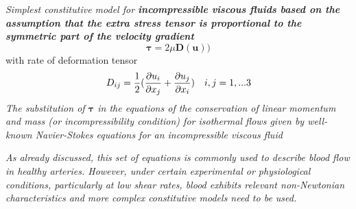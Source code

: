 \documentclass[11pt,letterpaper]{article}
\begin{document}
\textit{{\color{red}Simplest constitutive
model for \textbf{incompressible viscous fluids based on the assumption that the extra stress tensor is proportional to the symmetric part of the velocity gradient}}}\begin{equation}
    \bm{\tau}= 2\mu \bm{D}(\bm{u}))
\end{equation}
with rate of deformation tensor \begin{equation}
    D_{ij} = \frac{1}{2} \large( \frac{\partial u_i}{\partial x_j} + \frac{\partial u_j}{\partial x_i} \large) \hspace{10pt} i,j=1,...3
\end{equation}
\textit{The substitution of $\bm{\tau}$ in the equations of the conservation of linear momentum and mass (or incompressibility condition) for isothermal flows given by well-known Navier-Stokes equations for an incompressible viscous fluid}

\textit{As already discussed, this set of equations is commonly used to describe blood flow in healthy arteries.
However, under certain experimental or physiological conditions, particularly at low shear rates, blood exhibits relevant non-Newtonian characteristics and more complex constitutive models need to be used.}
\end{document}

